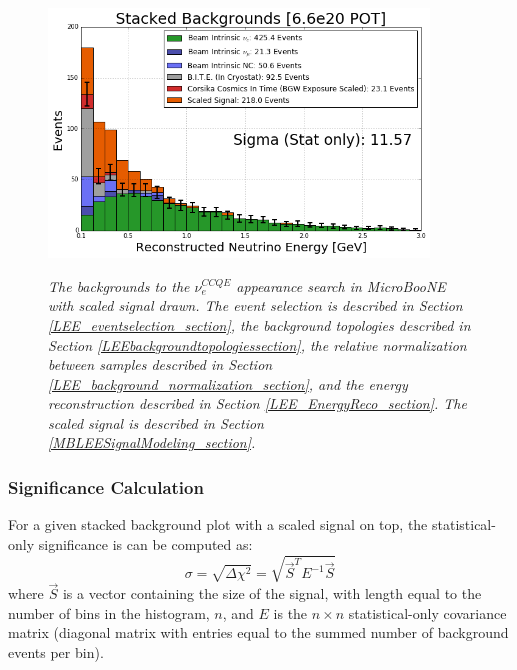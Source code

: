 \begin{figure}[ht!]
\centering
\includegraphics[width=0.9\textwidth]{Figures/LEE_perfectreco_fullstack_WithAnalysisCuts.png}\\
\caption{\textit{The backgrounds to the $\nu_e^{CCQE}$ appearance search in MicroBooNE with scaled signal drawn. The event selection is described in Section \ref{LEE_eventselection_section}, the background topologies described in Section \ref{LEEbackgroundtopologiessection}, the relative normalization between samples described in Section \ref{LEE_background_normalization_section}, and the energy reconstruction described in Section \ref{LEE_EnergyReco_section}. The scaled signal is described in Section \ref{MBLEESignalModeling_section}.}}
\label{LEE_perfectreco_fullstack_fig}
\end{figure}

\subsubsection{Significance Calculation}
For a given stacked background plot with a scaled signal on top, the statistical-only significance is can be computed as:
\begin{equation}\label{chisquaresigeqtn}
\sigma = \sqrt{\Delta \chi^2} = \sqrt{\vec{S}^TE^{-1}\vec{S}}
\end{equation}
where $\vec{S}$ is a vector containing the size of the signal, with length equal to the number of bins in the histogram, $n$, and $E$ is the $n\times n$ statistical-only covariance matrix (diagonal matrix with entries equal to the summed number of background events per bin).


